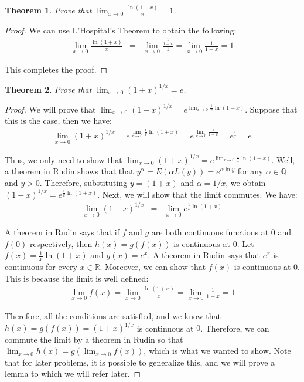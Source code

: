 \documentclass[psamsfonts]{amsart}
\newtheorem{thm}{Theorem}[section]
\theoremstyle{definition}
\theoremstyle{remark}
\numberwithin{equation}{section}
\begin{document}
\begin{thm}
Prove that $\lim_{x \to 0} \frac{\ln(1+x)}{x} = 1$.
\end{thm}

\begin{proof}
We can use L'Hospital's Theorem to obtain the following:
\begin{eqnarray}
\lim_{x \to 0} \frac{\ln(1+x)}{x} &=& \lim_{x \to 0} \frac{ \frac{1}{1+x}}{1} = \lim_{x \to 0} \frac{1}{1+x} = 1
\end{eqnarray}

This completes the proof. 
\end{proof}

\begin{thm}
Prove that $\lim_{x \to 0} (1+x)^{1/x} = e$.
\end{thm}

\begin{proof}
We will prove that $\lim_{x \to 0} (1+x)^{1/x} = e^{\lim_{x \to 0} \frac{1}{x} \ln (1+x)}$. Suppose that this is the case, then we have: 
\begin{eqnarray}
\lim_{x \to 0} (1+x)^{1/x} = e^{\lim_{x \to 0} \frac{1}{x} \ln(1+x)} = e^{\lim_{x \to 0} \frac{1}{1+x}} = e^1 = e
\end{eqnarray}

Thus, we only need to show that $\lim_{x \to 0} (1+x)^{1/x} = e^{\lim_{x \to 0} \frac{1}{x}\ln (1+x)}$. Well, a theorem in Rudin shows that that $y^{\alpha} = E(\alpha L(y)) = e^{\alpha \ln y}$ for any $\alpha \in \mathbb{Q}$ and $y > 0$. Therefore, substituting $y = (1+x)$ and $\alpha = 1/x$, we obtain $(1+x)^{1/x} = e^{\frac{1}{x} \ln(1+ x)}$. Next, we will show that the limit commutes. We have:
\begin{eqnarray}
\lim_{x \to 0} (1+x)^{1/x} &=& \lim_{x \to 0} e^{\frac{1}{x} \ln(1+ x)}
\end{eqnarray}

A theorem in Rudin says that if $f$ and $g$ are both continuous functions at $0$ and $f(0)$ respectively, then $h(x) = g(f(x))$ is continuous at $0$. Let $f(x) = \frac{1}{x} \ln(1+x)$ and $g(x) = e^x$. A theorem in Rudin says that $e^x$ is continuous for every $x \in \mathbb{R}$. Moreover, we can show that $f(x)$ is continuous at $0$. This is because the limit is well defined:
\begin{eqnarray}
\lim_{x \to 0} f(x) = \lim_{x \to 0} \frac{\ln(1+x)}{x} = \lim_{x \to 0} \frac{1}{1+x} = 1
\end{eqnarray}

Therefore, all the conditions are satisfied, and we know that $h(x) = g(f(x)) = (1+x)^{1/x}$ is continuous at $0$. Therefore, we can commute the limit by a theorem in Rudin so that $\lim_{x \to 0} h(x) = g( \lim_{x \to 0} f(x))$, which is what we wanted to show. Note that for later problems, it is possible to generalize this, and we will prove a lemma to which we will refer later.
\end{proof}
\end{document}

